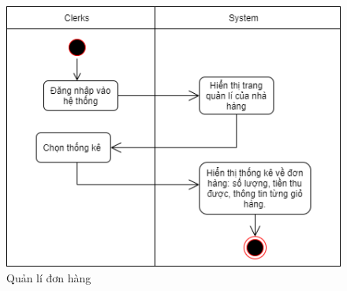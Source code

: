 \begin{figure}[!h]
    \begin{center}
        \includegraphics[scale=0.5]{Images/ActivityDiagram/AD_statistic.png}
    \end{center}
    \hspace{0.3cm}
    \caption{Quản lí đơn hàng}
\end{figure}